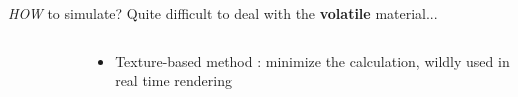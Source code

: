 \documentclass[handout,t]{beamer}
\begin{document}
\begin{frame}[t]{\emph{HOW} to simulate?}
  \textcolor[rgb]{0.5,0.5,0.5}{Quite difficult to deal with the \textbf{\color{blue}volatile} material...}
  \begin{columns} %
    \begin{column}{.48\textwidth}
      \begin{figure}[thpb]
        \centering
        \label{fig:system}
      \end{figure}
    \end{column}%
    \hfill%
    \begin{column}{.48\textwidth}
      \begin{itemize}
        \item Texture-based method : minimize the calculation, wildly used in real time rendering

\end{itemize}
\end{column}
\end{columns}
\end{frame}
\end{document}
